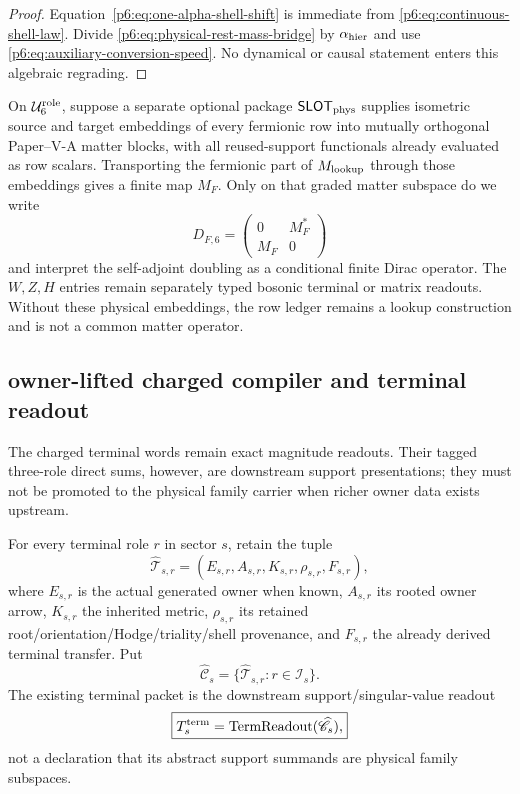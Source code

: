 \documentclass[12pt,a4paper]{article}
\newcommand{\Urole}{\mathcal U_6^{\rm role}}
\begin{document}
\begin{proof}
Equation~\eqref{p6:eq:one-alpha-shell-shift} is immediate from
\eqref{p6:eq:continuous-shell-law}.  Divide
\eqref{p6:eq:physical-rest-mass-bridge} by \(\alpha_{\rm hier}\) and use
\eqref{p6:eq:auxiliary-conversion-speed}.  No dynamical or causal statement
enters this algebraic regrading.
\end{proof}

\begin{corollary}
\label{p6:cor:fermionic-dirac-restriction}
On \(\Urole\), suppose a separate optional package
\(\mathsf{SLOT}_{\rm phys}\) supplies
isometric source and target
embeddings of every fermionic row into mutually orthogonal Paper--V-A matter
blocks, with all reused-support functionals already evaluated as row
scalars.  Transporting the fermionic part of \(M_{\rm lookup}\) through
those embeddings gives a finite map \(M_F\).  Only on that graded matter
subspace do we write
\[
D_{F,6}
=
\begin{pmatrix}0&M_F^*\\M_F&0\end{pmatrix}
\]
and interpret the self-adjoint doubling as a conditional finite Dirac
operator.  The \(W,Z,H\) entries remain separately typed bosonic terminal or
matrix readouts.  Without these physical embeddings, the row ledger remains
a lookup construction and is not a common matter operator.
\end{corollary}

\subsection{owner-lifted charged compiler and terminal readout}
\label{p6:sec:v588-owner-lifted-charged-compiler}
The charged terminal words remain exact magnitude readouts.  Their tagged
three-role direct sums, however, are downstream support presentations; they
must not be promoted to the physical family carrier when richer owner data
exists upstream.

\begin{definition}
\label{p6:def:v588-owner-resolved-charged-packet}
For every terminal role $r$ in sector $s$, retain the tuple
\[
 \widehat{\mathcal T}_{s,r}
 =(E_{s,r},A_{s,r},K_{s,r},\rho_{s,r},F_{s,r}),
\]
where $E_{s,r}$ is the actual generated owner when known,
$A_{s,r}$ its rooted owner arrow, $K_{s,r}$ the inherited metric,
$\rho_{s,r}$ its retained root/orientation/Hodge/triality/shell provenance,
and $F_{s,r}$ the already derived terminal transfer.  Put
\[
 \widehat{\mathscr C}_s
 =\{\widehat{\mathcal T}_{s,r}:r\in\mathcal I_s\}.
\]
The existing terminal packet is the downstream support/singular-value readout
\[
 \boxed{T_s^{\rm term}=\operatorname{TermReadout}(\widehat{\mathscr C}_s),}
\]
not a declaration that its abstract support summands are physical family
subspaces.
\end{definition}
\end{document}
